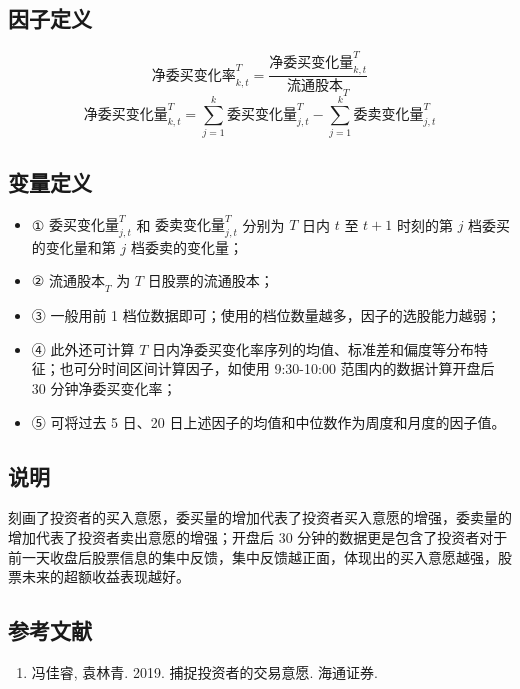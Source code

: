 \documentclass{article}
\begin{document}
\subsection{因子定义}
\begin{equation}
    \text{净委买变化率}^{T}_{k,t} = \frac{\text{净委买变化量}^{T}_{k,t}}{\text{流通股本}_{T}}
\end{equation}
\begin{equation}
    \text{净委买变化量}^{T}_{k,t} = \sum_{j=1}^{k}  \text{委买变化量}^{T}_{j,t} - \sum_{j=1}^{k}\text{委卖变化量}_{j,t}^T 
\end{equation}

\subsection{变量定义}
\begin{itemize}
    \item ① \(\text{委买变化量}^{T}_{j,t}\) 和 \(\text{委卖变化量}^{T}_{j,t}\) 分别为 \(T\) 日内 \(t\) 至 \(t+1\) 时刻的第 \(j\) 档委买的变化量和第 \(j\) 档委卖的变化量；
    \item ② \(\text{流通股本}_{T}\) 为 \(T\) 日股票的流通股本；
    \item ③ 一般用前 1 档位数据即可；使用的档位数量越多，因子的选股能力越弱；
    \item ④ 此外还可计算 \(T\) 日内净委买变化率序列的均值、标准差和偏度等分布特征；也可分时间区间计算因子，如使用 9:30-10:00 范围内的数据计算开盘后 30 分钟净委买变化率；
    \item ⑤ 可将过去 5 日、20 日上述因子的均值和中位数作为周度和月度的因子值。
\end{itemize}

\subsection{说明}
刻画了投资者的买入意愿，委买量的增加代表了投资者买入意愿的增强，委卖量的增加代表了投资者卖出意愿的增强；开盘后 30 分钟的数据更是包含了投资者对于前一天收盘后股票信息的集中反馈，集中反馈越正面，体现出的买入意愿越强，股票未来的超额收益表现越好。

\subsection{参考文献}
\begin{enumerate}
    \item 冯佳睿, 袁林青. 2019. 捕捉投资者的交易意愿. 海通证券.
\end{enumerate}
\end{document}
